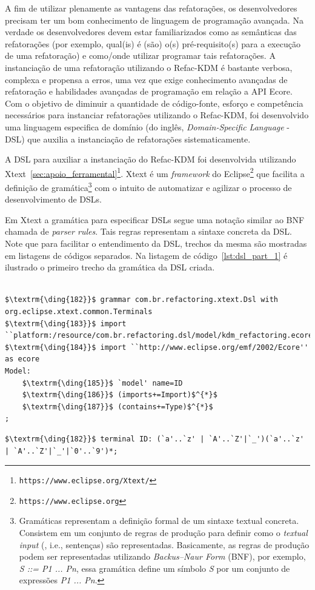 A fim de utilizar plenamente as vantagens das refatorações, os desenvolvedores precisam ter um bom conhecimento de linguagem de programação avançada. Na verdade os desenvolvedores devem estar familiarizados como as semânticas das refatorações (por exemplo, qual(is) é (são) o(s) pré-requisito(s) para a execução de uma refatoração) e como/onde utilizar programar tais refatorações. A instanciação de uma refatoração utilizando o Refac-KDM é bastante verbosa, complexa e propensa a erros, uma vez que exige conhecimento avançadas de refatoração e habilidades avançadas de programação em relação a API Ecore. Com o objetivo de diminuir a quantidade de código-fonte, esforço e competência necessários para instanciar refatorações utilizando o Refac-KDM, foi desenvolvido uma linguagem especifica de domínio (do inglês, \textit{Domain-Specific Language} - DSL) que auxilia a instanciação de refatorações sistematicamente. 

A DSL para auxiliar a instanciação do Refac-KDM foi desenvolvida utilizando Xtext~\ref{sec:apoio_ferramental}\footnote{\texttt{https://www.eclipse.org/Xtext/}}. Xtext é um \textit{framework} do Eclipse\footnote{\texttt{https://www.eclipse.org}} que facilita a definição de gramática\footnote{Gramáticas representam a definição formal de um sintaxe textual concreta. Consistem em um conjunto de regras de produção para definir como o \textit{textual input} (, i.e., sentenças) são representadas. Basicamente, as regras de produção podem ser representadas utilizando \textit{Backus–Naur Form} (BNF), por exemplo, \textit{S ::= P1 ... Pn}, essa gramática define um símbolo \textit{S} por um conjunto de expressões \textit{P1 ... Pn}.} 
com o intuito de automatizar e agilizar o processo de desenvolvimento de DSLs.

 Em Xtext a gramática para especificar DSLs segue uma notação similar ao BNF chamada de \textit{parser rules}. Tais regras representam a sintaxe concreta da DSL. Note que para facilitar o entendimento da DSL, trechos da mesma são mostradas em listagens de códigos separados. Na listagem de código~\ref{lst:dsl_part_1} é ilustrado o primeiro trecho da gramática da DSL criada. 

\begin{lstlisting}[language=Xtext, frame=single, basicstyle={\scriptsize}, mathescape=true, label={lst:dsl_part_1}, caption={Gramática da DSL - parte 1}]
	
$\textrm{\ding{182}}$ grammar com.br.refactoring.xtext.Dsl with org.eclipse.xtext.common.Terminals 
$\textrm{\ding{183}}$ import ``platform:/resource/com.br.refactoring.dsl/model/kdm_refactoring.ecore'
$\textrm{\ding{184}}$ import ``http://www.eclipse.org/emf/2002/Ecore'' as ecore
Model: 
	$\textrm{\ding{185}}$ `model' name=ID
	$\textrm{\ding{186}}$ (imports+=Import)$^{*}$
	$\textrm{\ding{187}}$ (contains+=Type)$^{*}$
;
\end{lstlisting}

\begin{lstlisting}[language=Xtext, frame=single, basicstyle=\scriptsize, mathescape=true, label={lst:dsl_part_2}, caption={Gramática da DSL - parte 2}]
	$\textrm{\ding{182}}$ terminal ID: (`a'..`z' | `A'..`Z'|`_')(`a'..`z' | `A'..`Z'|`_'|`0'..`9')*;
\end{lstlisting}